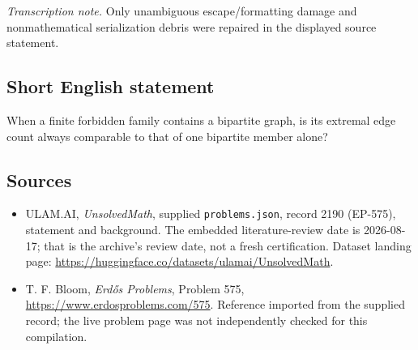 \documentclass[11pt,a4paper]{article}
\begin{document}
{\small\emph{Transcription note.} Only unambiguous escape/formatting damage and nonmathematical serialization debris were repaired in the displayed source statement.}

\subsection{Short English statement}

When a finite forbidden family contains a bipartite graph, is its extremal edge count always comparable to that of one bipartite member alone?

\subsection{Sources}

{\small

\begin{itemize}

\item[\hypertarget{source:2190:1}{S1}] ULAM.AI, \emph{UnsolvedMath}, supplied \texttt{problems.json}, record 2190 (EP-575), statement and background. The embedded literature-review date is 2026-08-17; that is the archive’s review date, not a fresh certification. Dataset landing page: \url{https://huggingface.co/datasets/ulamai/UnsolvedMath}.

\item[\hypertarget{source:2190:2}{S2}] T. F. Bloom, \emph{Erdős Problems}, Problem 575, \url{https://www.erdosproblems.com/575}. Reference imported from the supplied record; the live problem page was not independently checked for this compilation.

\end{itemize}

}

\label{end:2190}
\end{document}
